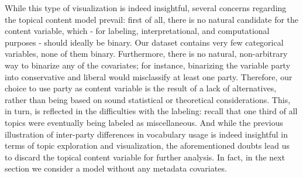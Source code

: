 While this type of visualization is indeed insightful, several concerns regarding the topical content model prevail: first of all, there is no natural candidate for the content variable, which - for labeling, interpretational, and computational purposes - should ideally be binary. Our dataset contains very few categorical variables, none of them binary. Furthermore, there is no natural, non-arbitrary way to binarize any of the covariates; for instance, binarizing the variable party into conservative and liberal would misclassify at least one party. Therefore, our choice to use party as content variable is the result of a lack of alternatives, rather than being based on sound statistical or theoretical considerations. This, in turn, is reflected in the difficulties with the labeling: recall that one third of all topics were eventually being labeled as miscellaneous. And while the previous illustration of inter-party differences in vocabulary usage is indeed insightful in terms of topic exploration and visualization, the aforementioned doubts lead us to discard the topical content variable for further analysis. In fact, in the next section we consider a model without any metadata covariates.